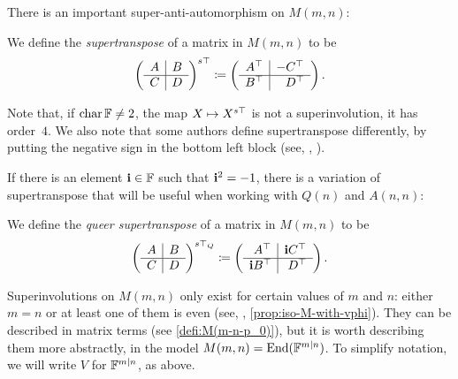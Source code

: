 There is an important super-anti-automorphism on $M(m,n)$:

\begin{defi}
    We define the \emph{supertranspose} of a matrix in $M(m,n)$ to be
    \[
        \left(\begin{array}{c|c}
            A & B\\
            \hline
            C & D
        \end{array}\right)^{s\top} \coloneqq
        \left(\begin{array}{c|c}
            A^{\top} & -C^{\top}\\
            \hline
            B^{\top} & \phantom{-}D^{\top}
        \end{array}\right).
    \]
\end{defi}

Note that, if $\operatorname{char} \mathbb{F} \neq 2$, the map $X \mapsto X^{s\top}$ is not a superinvolution, it has order~$4$. 
We also note that some authors define supertranspose differently, by putting the negative sign in the bottom left block (see, \eg, \cite[Subsection 1.1.2]{MR3012224}). 

If there is an element $\mathbf{i}\in \mathbb{F}$ such that $\mathbf{i}^2 = -1$, there is a variation of supertranspose that will be useful when working with $Q(n)$ and $A(n,n)$:

\begin{defi}\label{def:queer-stp}
    We define the \emph{queer supertranspose} of a matrix in $M(m,n)$ to be
    \[
        \left(\begin{array}{c|c}
            A & B\\
            \hline
            C & D
        \end{array}\right)\sTq \coloneqq
        \left(\begin{array}{c|c}
            \phantom{\bi}A\transp & \bi C\transp\\
            \hline
            \bi B\transp & \phantom{\bi} D\transp
        \end{array}\right).
    \]
\end{defi}

Superinvolutions on $M(m,n)$ only exist for certain values of $m$ and $n$: either $m=n$ or at least one of them is even (see, \eg, \cref{prop:iso-M-with-vphi}). 
They can be described in matrix terms (see \cref{defi:M(m-n-p_0)}), but it is worth describing them more abstractly, in the model $M(m,n) = \operatorname{End}(\mathbb{F}^{m|n})$. 
To simplify notation, we will write $V$ for $\mathbb{F}^{m|n}$, as above. 

